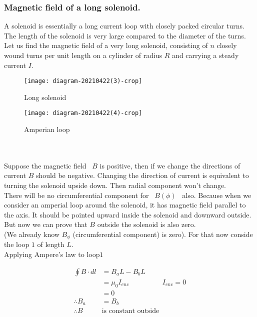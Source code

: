\subsubsection{Magnetic field of a long  solenoid. }
A solenoid is essentially a long current loop with closely packed circular turns. The length of the solenoid  is very large compared to  the diameter of the turns. 
Let us find the magnetic field of a very long solenoid, consisting of $n$ closely wound turns per unit length on a cylinder of radius $R$ and carrying a steady current $I$.

\begin{minipage}{.45\textwidth}
\begin{figure}[H]
		\begin{center}
		\texttt{[image: diagram-20210422(3)-crop]}
	\end{center}
\label{key}
\caption{Long solenoid}
	\end{figure}

\end{minipage}
\begin{minipage}{.45\textwidth}
	\begin{figure}[H]
		\begin{center}
			\texttt{[image: diagram-20210422(4)-crop]}
		\end{center}
	\label{key}
	\caption{Amperian loop}
	\end{figure}
\end{minipage}
\\\\Suppose the magnetic field \ $B$ is positive, then if we change the directions of current $B$ should be negative. Changing the direction of current is equivalent to turning the solenoid upside down. Then radial component won't change.\\
There will be no circumferential component for \ $B(\phi)$ \ also. Because when we consider an amperial loop around the solenoid, it has magnetic field parallel to the axis. It should be pointed upward inside the solenoid and downward outside. But now we can prove that $B$ outside the solenoid is also zero.\\
(We already know $B_\phi$ (circumferential component) is zero). For that now conside the loop $1$ of length $L$.\\
Applying Ampere's law to loop$1$\\
\begin{minipage}{0.65\textwidth}
	\begin{align*}
	\oint B\cdot dl&=B_a L-B_b L\\
	&=\mu_0 I_{enc} \hspace{2cm}I_{enc}=0\\
	&=0\\
	\therefore B_a&=B_b\\
	\therefore B\ &\text{is constant outside}
	\end{align*} 
\end{minipage}
